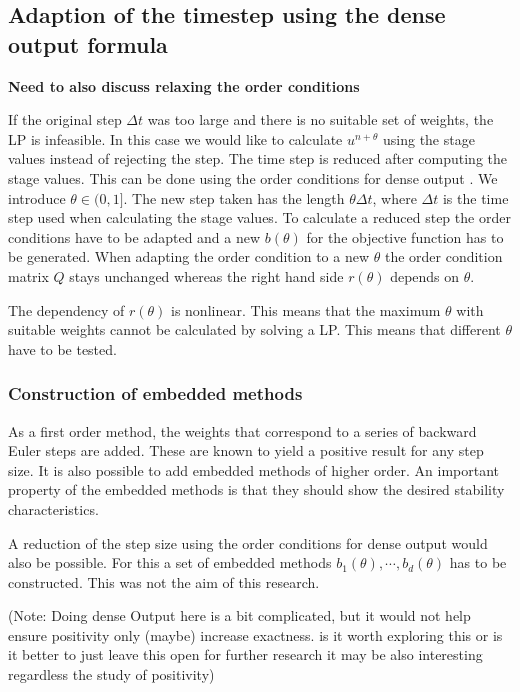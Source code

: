 \documentclass[a4paper]{article}
\numberwithin{equation}{section}
\theoremstyle{plain}
\theoremstyle{definition}
\numberwithin{theorem}{section}
\newcommand{\dt}{{\Delta t}}
\newcommand{\1}{\mathbbm{1}}
\begin{document}
\subsection{Adaption of the timestep using the dense output formula}

{\bf Need to also discuss relaxing the order conditions}

If the original step $\dt$ was too large and there is no suitable set of weights, the LP is infeasible. In this case we would like to calculate $u^{n+\theta}$ using the stage values instead of rejecting the step. The time step is reduced after computing the stage values. This can be done using the order conditions for dense output \cite[Section~II.6]{hairer_solving_1993}.
We introduce $\theta \in (0,1]$. The new step taken has the length $\theta \dt$, where $\dt$ is the time step used when calculating the stage values.
To calculate a reduced step the order conditions have to be adapted and a new $b(\theta)$ for the objective function has to be generated. 
When adapting the order condition to a new $\theta$ the order condition matrix $Q$ stays unchanged whereas the right hand side $r(\theta)$ depends on $\theta$.

The dependency of $r(\theta)$ is nonlinear. This means that the maximum $\theta$ with suitable weights cannot be calculated by solving a LP. This means that different $\theta$ have to be tested. 

\subsubsection{Construction of embedded methods}

As a first order method, the weights that correspond to a series of backward Euler steps are added. These are known to yield a positive result for any step size.
It is also possible to add embedded methods of higher order.
An important property of the embedded methods is that they should show the desired stability characteristics. 

A reduction of the step size using the order conditions for dense output would also be possible. For this a set of embedded methods $b_1(\theta),\cdots,b_d(\theta)$ has to be constructed. This was not the aim of this research.

(Note: Doing dense Output here is a bit complicated, but it would not help ensure positivity only (maybe) increase exactness.  is it worth exploring this or is it better to just leave this open for further research it may be also interesting regardless the study of positivity)
 
\end{document}
